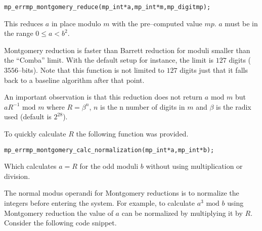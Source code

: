 \documentclass[synpaper]{book}
\begin{document}
\begin{alltt}
mp_err mp_montgomery_reduce(mp_int *a, mp_int *m, mp_digit mp);
\end{alltt}
This reduces $a$ in place modulo $m$ with the pre--computed value $mp$.   $a$ must be in the range
$0 \le a < b^2$.

Montgomery reduction is faster than Barrett reduction for moduli smaller than the ``Comba'' limit.  With the default
setup for instance, the limit is $127$ digits ($3556$--bits).   Note that this function is not limited to
$127$ digits just that it falls back to a baseline algorithm after that point.

An important observation is that this reduction does not return $a \mbox{ mod }m$ but $aR^{-1} \mbox{ mod }m$
where $R = \beta^n$, $n$ is the n number of digits in $m$ and $\beta$ is the radix used (default is $2^{28}$).

To quickly calculate $R$ the following function was provided.

\begin{alltt}
mp_err mp_montgomery_calc_normalization(mp_int *a, mp_int *b);
\end{alltt}
Which calculates $a = R$ for the odd moduli $b$ without using multiplication or division.

The normal modus operandi for Montgomery reductions is to normalize the integers before entering the system.  For
example, to calculate $a^3 \mbox { mod }b$ using Montgomery reduction the value of $a$ can be normalized by
multiplying it by $R$.  Consider the following code snippet.
\end{document}
